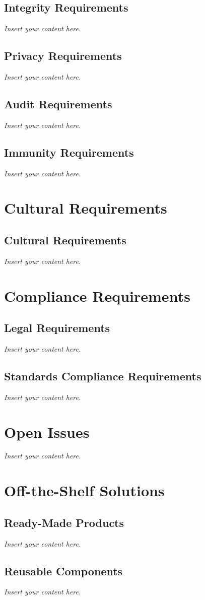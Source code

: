 \documentclass[12pt]{article}
\newcommand{\lips}{\textit{Insert your content here.}}
\begin{document}
\subsection{Integrity Requirements}
\lips
\subsection{Privacy Requirements}
\lips
\subsection{Audit Requirements}
\lips
\subsection{Immunity Requirements}
\lips

\section{Cultural Requirements}
\subsection{Cultural Requirements}
\lips

\section{Compliance Requirements}
\subsection{Legal Requirements}
\lips
\subsection{Standards Compliance Requirements}
\lips

\section{Open Issues}
\lips

\section{Off-the-Shelf Solutions}
\subsection{Ready-Made Products}
\lips
\subsection{Reusable Components}
\lips
\end{document}
